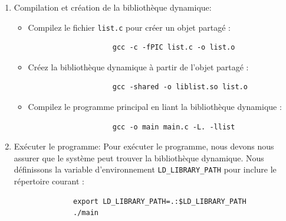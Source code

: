 \documentclass[a4paper,11pt]{article}
\begin{document}
        \begin{enumerate}
          \item Compilation et création de la bibliothèque dynamique:
            \begin{itemize}
              \item Compilez le fichier \texttt{list.c} pour créer un objet partagé :
                \begin{tcolorbox}[colback=lightgray!6, colframe=black, left=-20mm, right=5mm, top=2mm, bottom=-2mm, boxrule=0.1mm]
                  \begin{verbatim}
                    gcc -c -fPIC list.c -o list.o
                  \end{verbatim}
                \end{tcolorbox}
              \item Créez la bibliothèque dynamique à partir de l'objet partagé :
                \begin{tcolorbox}[colback=lightgray!6, colframe=black, left=-20mm, right=5mm, top=2mm, bottom=-2mm, boxrule=0.1mm]
                  \begin{verbatim}
                    gcc -shared -o liblist.so list.o
                  \end{verbatim}
                \end{tcolorbox}
              \item Compilez le programme principal en liant la bibliothèque dynamique :
                \begin{tcolorbox}[colback=lightgray!6, colframe=black, left=-20mm, right=5mm, top=2mm, bottom=-2mm, boxrule=0.1mm]
                  \begin{verbatim}
                    gcc -o main main.c -L. -llist
                  \end{verbatim}
                \end{tcolorbox}
            \end{itemize}
          \item Exécuter le programme: Pour exécuter le programme, nous devons nous assurer que le système peut trouver la bibliothèque dynamique. 
          Nous définissons la variable d'environnement \texttt{LD\_LIBRARY\_PATH} pour inclure le répertoire courant :

          \begin{tcolorbox}[colback=lightgray!6, colframe=black, left=-20mm, right=5mm, top=2mm, bottom=-2mm, boxrule=0.1mm]
            \begin{verbatim}
              export LD_LIBRARY_PATH=.:$LD_LIBRARY_PATH
              ./main
            \end{verbatim}
          \end{tcolorbox}
        \end{enumerate}
\end{document}
